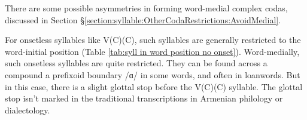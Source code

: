 \begin{table}[H]
	\centering
	\caption{Different syllable shapes in different word positions}
	\label{tab:syll in word position}
	\end{table}

There are some possible asymmetries in forming word-medial complex codas, discussed in Section \S\ref{section:syllable:OtherCodaRestrictions:AvoidMedial}. 

For onsetless syllables like V(C)(C), such syllables are generally restricted to the word-initial position (Table \ref{tab:syll in word position no onset}). Word-medially, such onsetless syllables are quite restricted. They can be found across a compound    a prefixoid boundary /ɑ/ in some words, and often in loanwords. But in this case,  there is a slight glottal stop before the V(C)(C) syllable. The glottal stop isn't marked in the traditional transcriptions in Armenian philology or dialectology. 


